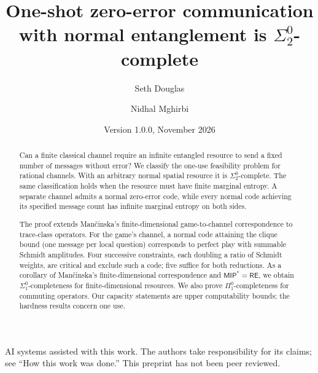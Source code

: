 \documentclass[11pt,a4paper]{article}
\title{One-shot zero-error communication with normal entanglement is $\Sigma^0_2$-complete}
\author{Seth Douglas \and Nidhal Mghirbi}
\date{Version 1.0.0, November 2026}
\theoremstyle{definition}\newtheorem{definition}[theorem]{Definition}
\theoremstyle{remark}\newtheorem*{remark}{Remark}
\begin{document}
\maketitle
\begin{abstract}
Can a finite classical channel require an infinite entangled resource to send a fixed number of messages without error? We classify the one-use feasibility problem for rational channels. With an arbitrary normal spatial resource it is $\Sigma^0_2$-complete. The same classification holds when the resource must have finite marginal entropy. A separate channel admits a normal zero-error code, while every normal code achieving its specified message count has infinite marginal entropy on both sides.

The proof extends Man\v{c}inska's finite-dimensional game-to-channel correspondence to trace-class operators. For the game's channel, a normal code attaining the clique bound (one message per local question) corresponds to perfect play with summable Schmidt amplitudes. Four successive constraints, each doubling a ratio of Schmidt weights, are critical and exclude such a code; five suffice for both reductions. As a corollary of Man\v{c}inska's finite-dimensional correspondence and $\mathsf{MIP}^*=\mathsf{RE}$, we obtain $\Sigma^0_1$-completeness for finite-dimensional resources. We also prove $\Pi^0_1$-completeness for commuting operators. Our capacity statements are upper computability bounds; the hardness results concern one use.
\end{abstract}
\begin{center}\small AI systems assisted with this work. The authors take responsibility for its claims; see ``How this work was done.'' This preprint has not been peer reviewed.\end{center}
\clearpage
{\small\tableofcontents}
\clearpage









\appendix



\end{document}
